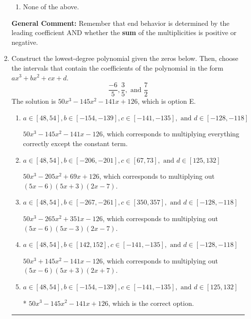 \documentclass{extbook}[14pt]
\newcommand{\litem}[1]{\item #1

\rule{\textwidth}{0.4pt}}
\begin{document}
\begin{enumerate}
{\begin{enumerate}[label=\Alph*.]
\begin{multicols}{2}
\end{multicols}\item None of the above.\end{enumerate}
\textbf{General Comment:} Remember that end behavior is determined by the leading coefficient AND whether the \textbf{sum} of the multiplicities is positive or negative.
}
\litem{
Construct the lowest-degree polynomial given the zeros below. Then, choose the intervals that contain the coefficients of the polynomial in the form $ax^3+bx^2+cx+d$.
\[ \frac{-6}{5}, \frac{3}{5}, \text{ and } \frac{7}{2} \]The solution is \( 50x^{3} -145 x^{2} -141 x + 126 \), which is option E.\begin{enumerate}[label=\Alph*.]
\item \( a \in [48, 54], b \in [-154, -139], c \in [-141, -135], \text{ and } d \in [-128, -118] \)

$50x^{3} -145 x^{2} -141 x -126$, which corresponds to multiplying everything correctly except the constant term.
\item \( a \in [48, 54], b \in [-206, -201], c \in [67, 73], \text{ and } d \in [125, 132] \)

$50x^{3} -205 x^{2} +69 x + 126$, which corresponds to multiplying out $(5x -6)(5x + 3)(2x -7)$.
\item \( a \in [48, 54], b \in [-267, -261], c \in [350, 357], \text{ and } d \in [-128, -118] \)

$50x^{3} -265 x^{2} +351 x -126$, which corresponds to multiplying out $(5x -6)(5x -3)(2x -7)$.
\item \( a \in [48, 54], b \in [142, 152], c \in [-141, -135], \text{ and } d \in [-128, -118] \)

$50x^{3} +145 x^{2} -141 x -126$, which corresponds to multiplying out $(5x -6)(5x + 3)(2x + 7)$.
\item \( a \in [48, 54], b \in [-154, -139], c \in [-141, -135], \text{ and } d \in [125, 132] \)

* $50x^{3} -145 x^{2} -141 x + 126$, which is the correct option.
\end{enumerate}

}
\end{enumerate}
\end{document}
